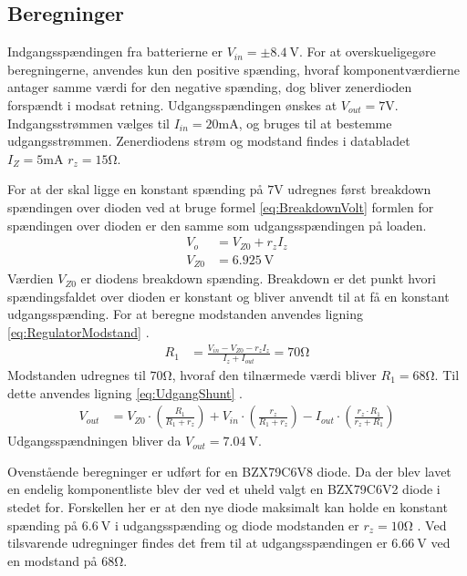 \subsection{Beregninger}
Indgangsspændingen fra batterierne er $V_{in} = \pm \SI{8.4}{\volt}$. 
For at overskueligegøre beregningerne, anvendes kun den positive spænding, hvoraf komponentværdierne antager samme værdi for den negative spænding, dog bliver zenerdioden forspændt i modsat retning.
Udgangsspændingen ønskes at $V_{out} = 7 \si{\volt}$. 
Indgangsstrømmen vælges til $I_{in} = 20\si{\milli\ampere}$, og bruges til at bestemme udgangsstrømmen.
Zenerdiodens strøm og modstand findes i databladet $I_Z = 5 \si{\milli\ampere}$ $r_z = 15 \si{\ohm}$. \cite[Side. 1 Kolonne 12]{ZenerDiode}

For at der skal ligge en konstant spænding på $7 \si{\volt}$ udregnes først breakdown spændingen over dioden ved at bruge formel \ref{eq:BreakdownVolt} \cite[Side. 146]{Sedra19uu} formlen for spændingen over dioden er den samme som udgangsspændingen på loaden. 
\begin{align}
	V_o & = V_{Z0} + r_z I_z \label{eq:BreakdownVolt} \\
	V_{Z0} & = \SI{6.925}{\volt}
	\end{align}
Værdien $V_{Z0}$ er diodens breakdown spænding.
Breakdown er det punkt hvori spændingsfaldet over dioden er konstant og bliver anvendt til at få en konstant udgangsspænding.
For at beregne modstanden anvendes ligning \ref{eq:RegulatorModstand} \cite[Side. 149]{Sedra19uu}.
\begin{align}
	R_1 & = \frac{V_{in}-V_{Z0}-r_z I_z}{I_z+I_{out}} = 70\si{\ohm} \label{eq:RegulatorModstand}
\end{align}
Modstanden udregnes til $70 \si{\ohm}$, hvoraf den tilnærmede værdi bliver $R_1 = 68 \si{\ohm}$.
Til dette anvendes ligning \ref{eq:UdgangShunt} \cite[Side. 149]{Sedra19uu}.
\begin{align}
	V_{out} & = V_{Z0} \cdot \left( \frac{R_1}{R_1+r_z} \right) + V_{in} \cdot \left( \frac{r_z}{R_1+r_z} \right) - I_{out} \cdot \left( \frac{r_z \cdot R_1}{r_z+R_1} \right) \label{eq:UdgangShunt}
\end{align}
Udgangsspændningen bliver da $V_{out} = \SI{7.04}{\volt}$.

Ovenstående beregninger er udført for en BZX79C6V8 diode. 
Da der blev lavet en endelig komponentliste blev der ved et uheld valgt en BZX79C6V2 diode i stedet for. 
Forskellen her er at den nye diode maksimalt kan holde en konstant spænding på $\SI{6.6}{\volt}$ i udgangsspænding og diode modstanden er $r_z = 10 \si{\ohm}$ \cite[Side. 1 Kolonne 11]{ZenerDiode}.
Ved tilsvarende udregninger findes det frem til at udgangsspændingen er $\SI{6.66}{\volt}$ ved en modstand på $68 \si{\ohm}$.
